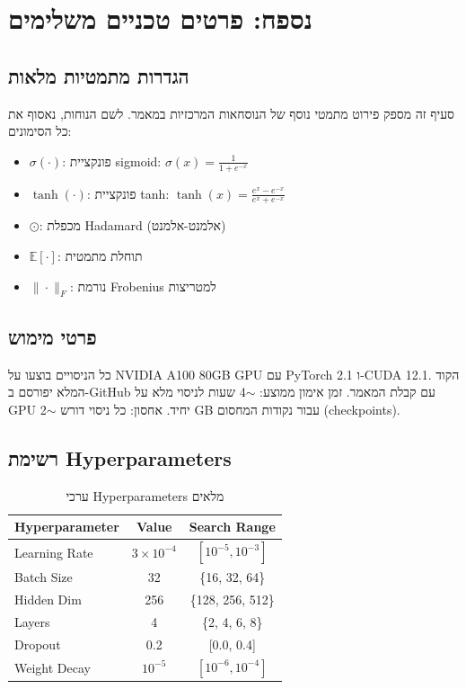 
\chapter{נספח: פרטים טכניים משלימים}

\section{הגדרות מתמטיות מלאות}

סעיף זה מספק פירוט מתמטי נוסף של הנוסחאות המרכזיות במאמר.
לשם הנוחות, נאסוף את כל הסימונים:

\begin{itemize}
\item \(\sigma(\cdot)\): פונקציית \textenglish{sigmoid}: \(\sigma(x) = \frac{1}{1+e^{-x}}\)
\item \(\tanh(\cdot)\): פונקציית \textenglish{tanh}: \(\tanh(x) = \frac{e^x - e^{-x}}{e^x + e^{-x}}\)
\item \(\odot\): מכפלת \textenglish{Hadamard} (אלמנט-אלמנט)
\item \(\mathbb{E}[\cdot]\): תוחלת מתמטית
\item \(\|\cdot\|_F\): נורמת \textenglish{Frobenius} למטריצות
\end{itemize}

\section{פרטי מימוש}

כל הניסויים בוצעו על \textenglish{NVIDIA A100 80GB GPU} עם \textenglish{PyTorch 2.1} ו-\textenglish{CUDA 12.1}.
הקוד המלא יפורסם ב-\textenglish{GitHub} עם קבלת המאמר. 
זמן אימון ממוצע: \textenglish{$\sim$4 שעות} לניסוי מלא על \textenglish{GPU} יחיד.
אחסון: כל ניסוי דורש \textenglish{$\sim$2 GB} עבור נקודות המחסום (\textenglish{checkpoints}).

\section{רשימת \textenglish{Hyperparameters}}

\begin{table}[H]
\centering
\caption{ערכי \textenglish{Hyperparameters} מלאים}
\label{tab:hparams}
\begin{english}
\begin{tabular}{lcc}
\toprule
\textbf{Hyperparameter} & \textbf{Value} & \textbf{Search Range} \\
\midrule
Learning Rate       & $3 \times 10^{-4}$ & $[10^{-5}, 10^{-3}]$ \\
Batch Size          & 32              & \{16, 32, 64\}       \\
Hidden Dim          & 256             & \{128, 256, 512\}    \\
Layers              & 4               & \{2, 4, 6, 8\}       \\
Dropout             & 0.2             & [0.0, 0.4]           \\
Weight Decay        & $10^{-5}$       & $[10^{-6}, 10^{-4}]$ \\
\bottomrule
\end{tabular}
\end{english}
\end{table}
